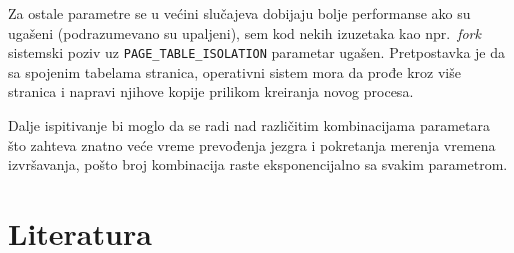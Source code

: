 \documentclass[12pt]{report}
\begin{document}
Za ostale parametre se u većini slučajeva dobijaju bolje performanse ako su ugašeni (podrazumevano su upaljeni), sem kod nekih izuzetaka kao npr.\ \textit{fork} sistemski poziv uz \texttt{PAGE\_TABLE\_ISOLATION} parametar ugašen. Pretpostavka je da sa spojenim tabelama stranica, operativni sistem mora da prođe kroz više stranica i napravi njihove kopije prilikom kreiranja novog procesa.

Dalje ispitivanje bi moglo da se radi nad različitim kombinacijama parametara što zahteva znatno veće vreme prevođenja jezgra i pokretanja merenja vremena izvršavanja, pošto broj kombinacija raste eksponencijalno sa svakim parametrom.

\chapter{Literatura}
\sloppy
\printbibliography[heading=none]
\end{document}
